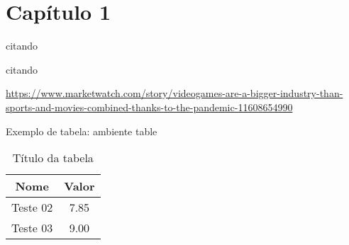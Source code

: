 \chapter{Capítulo 1}

citando \cite{IDC2021}

citando \cite{Witkowski2021}

\url{https://www.marketwatch.com/story/videogames-are-a-bigger-industry-than-sports-and-movies-combined-thanks-to-the-pandemic-11608654990}

Exemplo de tabela: ambiente table

\begin{comment} %
Veja que não aparece no texto compilado. Utilize para fazer comentários longos.
\end{comment}

\begin{table}[H]
    \centering
    \begin{small}
         \caption{Título da tabela}
         \begin{tabular}{c c}
         \hline
            Nome   &  Valor\\
         \hline
            Teste 02   &  7.85\\
            Teste 03   &  9.00\\
        \hline
         \end{tabular}
    \end{small}
    \label{tab:tituloTabela}
\end{table}